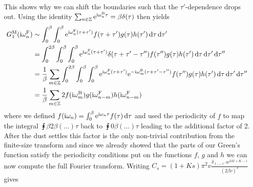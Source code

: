 \documentclass[english, parskip=full]{scrartcl}
\begin{document}
This shows why we can shift the boundaries such that the $\tau'$-dependence drops out.
Using the identity $\sum_{n\in\mathbb{Z}} \text{e}^{\text{i} \omega_n^{\text{B}} \tau} = \beta \delta(\tau)$ then yields
\begin{align}
G_1^{\text{M}}(\text{i}\omega_n^{\text{F}}) &\sim \int_{0}^{\beta} \int_{0}^{\beta} \text{e}^{\text{i}\omega_n^{\text{F}}(\tau+\tau')} f(\tau+\tau') g(\tau) h(\tau') \,\mathrm{d}\tau \,\mathrm{d}\tau'\\
&= \int_{0}^{2\beta} \int_{0}^{\beta} \int_{0}^{\beta} \text{e}^{\text{i}\omega_n^{\text{F}}(\tau+\tau')} \delta(\tau+\tau'-\tau'') f(\tau'') g(\tau) h(\tau') \,\mathrm{d}\tau \,\mathrm{d}\tau' \,\mathrm{d}\tau''\\
&= \frac{1}{\beta} \sum_{m\in\mathbb{Z}} \int_{0}^{2\beta} \int_{0}^{\beta} \int_{0}^{\beta} \text{e}^{\text{i}\omega_n^{\text{F}}(\tau+\tau')} \text{e}^{-\text{i}\omega_m^{\text{B}}(\tau+\tau'-\tau'')} f(\tau'') g(\tau) h(\tau') \,\mathrm{d}\tau \,\mathrm{d}\tau' \,\mathrm{d}\tau''\\
&= \frac{1}{\beta} \sum_{m\in\mathbb{Z}} 2f(\text{i}\omega_m^{\text{B}}) g(\text{i}\omega_{n-m}^{\text{F}}) h(\text{i}\omega_{n-m}^{\text{F}})
\end{align}
where we defined $f(\text{i}\omega_n) = \int_{0}^{\beta} \text{e}^{\text{i}\omega_n\tau} f(\tau) \,\mathrm{d}\tau$ and used the periodicity of $f$ to map the integral $\intx{\beta}{2\beta}{(\dots)}{\tau}$ back to $\intx{0}{\beta}{(\dots)}{\tau}$ leading to the additional factor of 2.
After the dust settles this factor is the only non-trivial contribution from the finite-size transform and since we already showed that the parts of our Green's function satisfy the periodicity conditions put on the functions $f$, $g$ and $h$ we can now compute the full Fourier transform.
Writing $C_{s}= (1+Ks)\pi^2 v \frac{\delta_{\ell,-\ell'} w^{2M+K-1}}{(2\beta v)^3}$ gives
\end{document}
